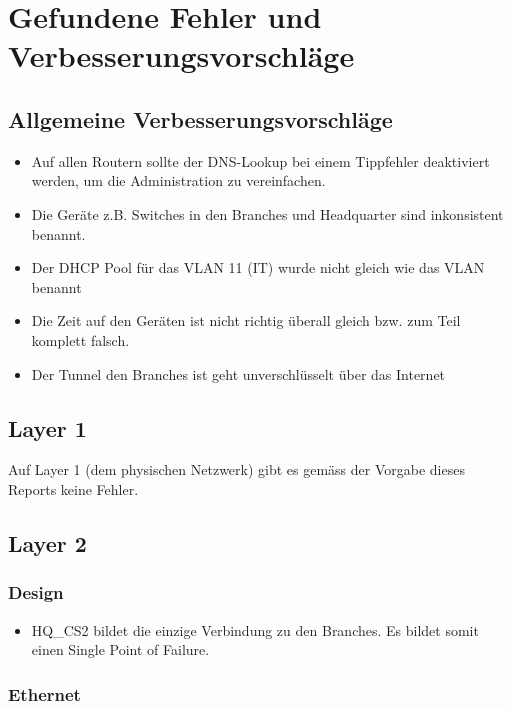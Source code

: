 



\section{Gefundene Fehler und Verbesserungsvorschläge}


\subsection{Allgemeine Verbesserungsvorschläge}

\begin{itemize}
	\item Auf allen Routern sollte der DNS-Lookup bei einem Tippfehler deaktiviert werden, um die Administration zu vereinfachen.
	\item Die Geräte z.B. Switches in den Branches und Headquarter sind inkonsistent benannt.
	\item Der DHCP Pool für das VLAN 11 (IT) wurde nicht gleich wie das VLAN benannt
	\item Die Zeit auf den Geräten ist nicht richtig überall gleich bzw. zum Teil komplett falsch.
	\item Der Tunnel den Branches ist geht unverschlüsselt über das Internet
\end{itemize}

\subsection{Layer 1}
Auf Layer 1 (dem physischen Netzwerk) gibt es gemäss der Vorgabe dieses Reports keine Fehler.

\subsection{Layer 2}
\subsubsection{Design}
\begin{itemize}
	\item HQ\_CS2 bildet die einzige Verbindung zu den Branches. Es bildet somit einen Single Point of Failure.
\end{itemize}

\subsubsection{Ethernet}

